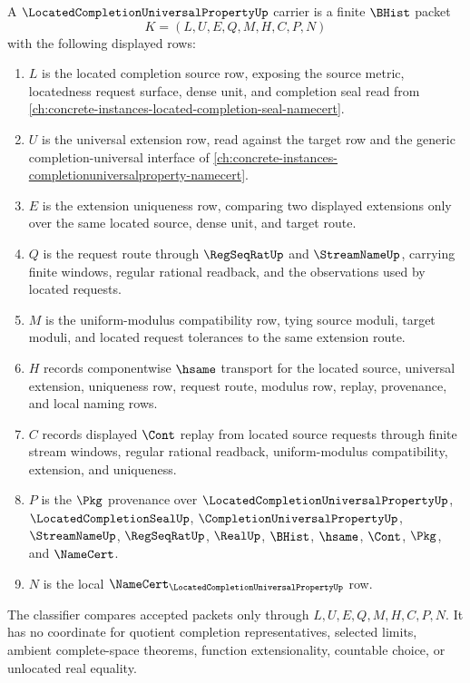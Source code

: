 \begin{definition}
\label{def:located-completion-universal-property-carrier}
A $\LocatedCompletionUniversalPropertyUp$ carrier is a finite $\BHist$ packet
$$
K=(L,U,E,Q,M,H,C,P,N)
$$
with the following displayed rows:
\begin{enumerate}
\item $L$ is the located completion source row, exposing the source metric, locatedness request surface, dense unit, and completion seal read from \autoref{ch:concrete-instances-located-completion-seal-namecert}.
\item $U$ is the universal extension row, read against the target row and the generic completion-universal interface of \autoref{ch:concrete-instances-completionuniversalproperty-namecert}.
\item $E$ is the extension uniqueness row, comparing two displayed extensions only over the same located source, dense unit, and target route.
\item $Q$ is the request route through $\RegSeqRatUp$ and $\StreamNameUp$, carrying finite windows, regular rational readback, and the observations used by located requests.
\item $M$ is the uniform-modulus compatibility row, tying source moduli, target moduli, and located request tolerances to the same extension route.
\item $H$ records componentwise $\hsame$ transport for the located source, universal extension, uniqueness row, request route, modulus row, replay, provenance, and local naming rows.
\item $C$ records displayed $\Cont$ replay from located source requests through finite stream windows, regular rational readback, uniform-modulus compatibility, extension, and uniqueness.
\item $P$ is the $\Pkg$ provenance over $\LocatedCompletionUniversalPropertyUp$, $\LocatedCompletionSealUp$, $\CompletionUniversalPropertyUp$, $\StreamNameUp$, $\RegSeqRatUp$, $\RealUp$, $\BHist$, $\hsame$, $\Cont$, $\Pkg$, and $\NameCert$.
\item $N$ is the local $\NameCert_{\LocatedCompletionUniversalPropertyUp}$ row.
\end{enumerate}
The classifier compares accepted packets only through $L,U,E,Q,M,H,C,P,N$. It has no coordinate for quotient completion representatives, selected limits, ambient complete-space theorems, function extensionality, countable choice, or unlocated real equality.
\end{definition}

